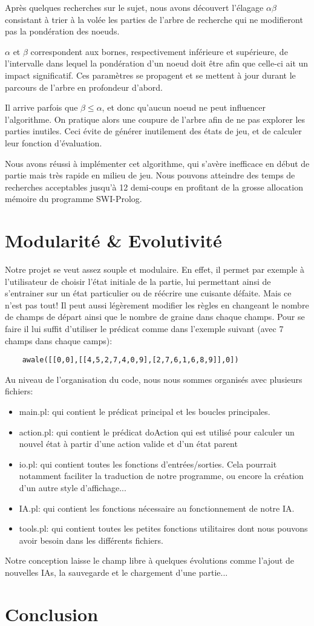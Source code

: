 \documentclass[]{article}
\begin{document}
Après quelques recherches sur le sujet, nous avons découvert l'élagage $\alpha\beta$ consistant à trier à la volée les parties de l'arbre de recherche qui ne modifieront pas la pondération des noeuds.

$\alpha$ et $\beta$ correspondent aux bornes, respectivement inférieure et supérieure, de l'intervalle dans lequel la pondération d'un noeud doit être afin que celle-ci ait un impact significatif. Ces paramètres se propagent et se mettent à jour durant le parcours de l'arbre en profondeur d'abord.

Il arrive parfois que $\beta \leq \alpha$, et donc qu'aucun noeud ne peut influencer l'algorithme. On pratique alors une coupure de l'arbre afin de ne pas explorer les parties inutiles. Ceci évite de générer inutilement des états de jeu, et de calculer leur fonction d'évaluation.

Nous avons réussi à implémenter cet algorithme, qui s'avère inefficace en début de partie mais très rapide en milieu de jeu. Nous pouvons atteindre des temps de recherches acceptables jusqu'à 12 demi-coups en profitant de la grosse allocation mémoire du programme SWI-Prolog.


\section{Modularité \& Evolutivité}

Notre projet se veut assez souple et modulaire. En effet, il permet par exemple à l'utilisateur de choisir l'état initiale de la partie, lui permettant ainsi de s'entrainer sur un état particulier ou de réécrire une cuisante défaite.
Mais ce n'est pas tout! Il peut aussi légèrement modifier les règles en changeant le nombre de champs de départ ainsi que le nombre de graine dans chaque champs. Pour se faire il lui suffit d'utiliser le prédicat comme dans l'exemple suivant (avec 7 champs dans chaque camps):

\begin{verbatim}
	awale([[0,0],[[4,5,2,7,4,0,9],[2,7,6,1,6,8,9]],0])
\end{verbatim}

	
Au niveau de l'organisation du code, nous nous sommes organisés avec plusieurs fichiers:
\begin{itemize}
\item main.pl:		qui contient le prédicat principal et les boucles principales.
\item action.pl:		qui contient le prédicat doAction qui est utilisé pour calculer un nouvel état à partir d'une action valide et d'un état parent
\item io.pl:			qui contient toutes les fonctions d'entrées/sorties. Cela pourrait notamment faciliter la traduction de notre programme, ou encore la création d'un autre style d'affichage...
\item IA.pl:			qui contient les fonctions nécessaire au fonctionnement de notre IA.
\item tools.pl:		qui contient toutes les petites fonctions utilitaires dont nous pouvons avoir besoin dans les différents fichiers.
\end{itemize}


	
Notre conception laisse le champ libre à quelques évolutions comme l'ajout de nouvelles IAs, la sauvegarde et le chargement d'une partie... 

\section{Conclusion}
\end{document}
